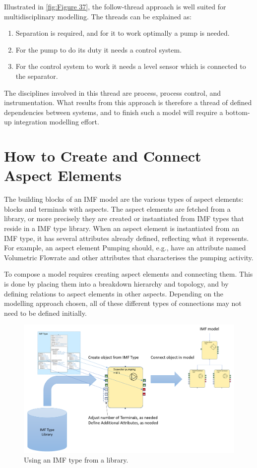 \documentclass[../main.tex]{subfiles}
\begin{document}
Illustrated in \autoref{fig:Figure 37}, the follow-thread approach is well suited for multidisciplinary modelling. The threads can be
explained as:

\begin{enumerate}
  \item Separation is required, and for it to work optimally a pump is needed.
  \item For the pump to do its duty it needs a control system.
  \item For the control system to work it needs a level sensor which is connected to the separator.
\end{enumerate}
The disciplines involved in this thread are process, process control, and instrumentation. What results from this
approach is therefore a thread of defined dependencies between systems, and to finish such a model will require a
bottom-up integration modelling effort. 

\section{How to Create and Connect Aspect Elements}
The building blocks of an IMF model are the various types of aspect elements: blocks and terminals with aspects. The aspect elements are fetched from a library, or more precisely they are created or instantiated from IMF types that reside
in a IMF type library. When an aspect element is instantiated from an IMF type, it has several attributes already defined,
reflecting what it represents. For example, an aspect element Pumping should, e.g., have an attribute
named Volumetric Flowrate and other attributes that characterises the pumping activity.

To compose a model requires creating aspect elements and connecting them. This is done by placing them into
a breakdown hierarchy and topology, and by defining relations to aspect elements
in other aspects. Depending on the modelling approach chosen, all of these different types of connections may not
need to be defined initially.

\begin{figure}[htb]
  \centering
  \includegraphics[width=1\textwidth]{img/IMFmanual-img0xx.png}
  \caption{Using an IMF type from a library.}
  \label{fig:Figure 38}
\end{figure}
\end{document}
